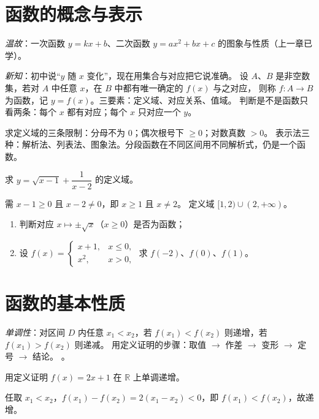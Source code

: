 \begin{procedure}

\section{函数的概念与表示}
\textit{温故}：一次函数 $y=kx+b$、二次函数 $y=ax^2+bx+c$ 的图象与性质（上一章已学）。

\textit{新知}：初中说“$y$ 随 $x$ 变化”，现在用集合与对应把它说准确。
设 $A$、$B$ 是非空数集，若对 $A$ 中任意 $x$，在 $B$ 中都有唯一确定的 $f(x)$ 与之对应，
则称 $f:A\to B$ 为函数，记 $y=f(x)$。三要素：定义域、对应关系、值域。
判断是不是函数只看两条：每个 $x$ 都有对应；每个 $x$ 只对应一个 $y$。

求定义域的三条限制：分母不为 $0$；偶次根号下 $\geq0$；对数真数 $>0$。
表示法三种：解析法、列表法、图象法。分段函数在不同区间用不同解析式，仍是一个函数。

\begin{example}
求 $y=\sqrt{x-1}+\dfrac{1}{x-2}$ 的定义域。
\end{example}
\begin{solution}
需 $x-1\geq0$ 且 $x-2\neq0$，即 $x\geq1$ 且 $x\neq2$。
定义域 $[1,2)\cup(2,+\infty)$。
\end{solution}

\begin{exercise}
\begin{enumerate}
  \item 判断对应 $x\mapsto\pm\sqrt{x}$（$x\geq0$）是否为函数；
  \item 设 $f(x)=\begin{cases}x+1,&x\leq0,\\ x^2,&x>0,\end{cases}$ 求 $f(-2)$、$f(0)$、$f(1)$。
\end{enumerate}
\end{exercise}

\section{函数的基本性质}
\textit{单调性}：对区间 $D$ 内任意 $x_1<x_2$，若 $f(x_1)<f(x_2)$ 则递增，若 $f(x_1)>f(x_2)$ 则递减。
用定义证明的步骤：取值 $\to$ 作差 $\to$ 变形 $\to$ 定号 $\to$ 结论。
。

\begin{example}
用定义证明 $f(x)=2x+1$ 在 $\mathbb{R}$ 上单调递增。
\end{example}
\begin{solution}
任取 $x_1<x_2$，$f(x_1)-f(x_2)=2(x_1-x_2)<0$，即 $f(x_1)<f(x_2)$，故递增。
\end{solution}


\end{procedure}

